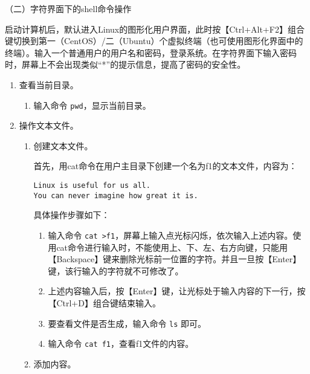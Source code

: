 \vspace{0.1in}
（二）字符界面下的shell命令操作

启动计算机后，默认进入Linux的图形化用户界面，此时按【Ctrl+Alt+F2】组合键切换到第一（CentOS）/二（Ubuntu）个虚拟终端（也可使用图形化界面中的终端）。输入一个普通用户的用户名和密码，登录系统。在字符界面下输入密码时，屏幕上不会出现类似“*”的提示信息，提高了密码的安全性。
\begin{enumerate}
  \item 查看当前目录。
    \begin{enumerate}
      \item 输入命令 \verb|pwd|，显示当前目录。
    \end{enumerate}
  \item 操作文本文件。
    \begin{enumerate}
      \item 创建文本文件。 

首先，用cat命令在用户主目录下创建一个名为f1的文本文件，内容为：
\begin{verbatim}
Linux is useful for us all.
You can never imagine how great it is.
\end{verbatim}
具体操作步骤如下：
    \begin{enumerate}
      \item 输入命令 \verb|cat >f1|，屏幕上输入点光标闪烁，依次输入上述内容。使用cat命令进行输入时，不能使用上、下、左、右方向键，只能用【Backspace】键来删除光标前一位置的字符。并且一旦按【Enter】键，该行输入的字符就不可修改了。
      \item 上述内容输入后，按【Enter】键，让光标处于输入内容的下一行，按【Ctrl+D】组合键结束输入。
      \item 要查看文件是否生成，输入命令 \verb|ls| 即可。
      \item 输入命令 \verb|cat f1|，查看f1文件的内容。
    \end{enumerate}
  \item 添加内容。


\end{enumerate}
\end{enumerate}
